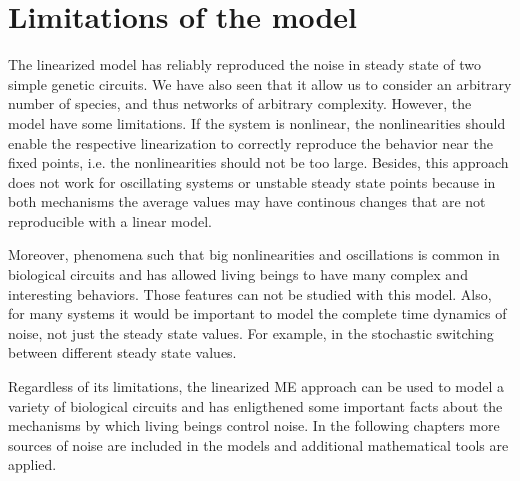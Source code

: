 \section{Limitations of the model}

The linearized model has reliably reproduced the noise in steady state of two simple genetic circuits. We have also seen that it allow us to consider an arbitrary number of species, and thus networks of arbitrary complexity. However, the model have some limitations. If the system is nonlinear, the nonlinearities should enable the respective linearization to correctly reproduce the behavior near the fixed points, i.e. the nonlinearities should not be too large. Besides, this approach does not work for oscillating systems or unstable steady state points because in both mechanisms the average values may have continous changes that are not reproducible with a linear model.

Moreover, phenomena such that big nonlinearities and oscillations is common in biological circuits and has allowed living beings to have many complex and interesting behaviors. Those features can not be studied with this model. Also, for many systems it would be important to model the complete time dynamics of noise, not just the steady state values. For example, in the stochastic switching between different steady state values.

Regardless of its limitations, the linearized ME approach can be used to model a variety of biological circuits and has enligthened some important facts about the mechanisms by which living beings control noise. In the following chapters more sources of noise are included in the models and additional mathematical tools are applied.

